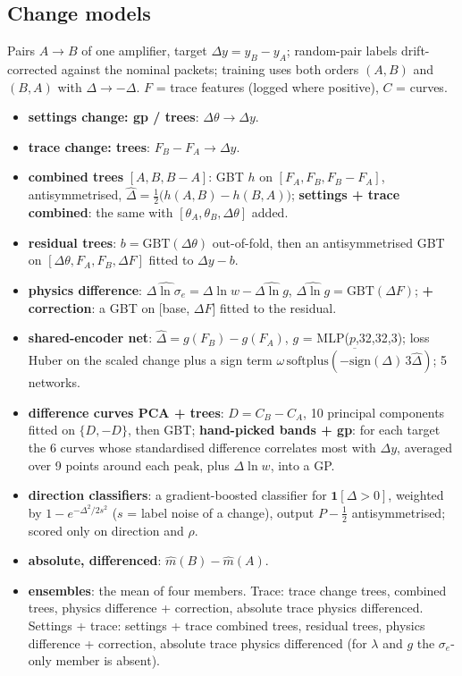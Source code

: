\documentclass[10pt,a4paper]{article}
\newcommand{\one}{\mathbf 1}
\begin{document}
\subsection{Change models}
Pairs $A\to B$ of one amplifier, target $\Delta y=y_B-y_A$; random-pair labels drift-corrected against the nominal packets;
training uses both orders $(A,B)$ and $(B,A)$ with $\Delta\to-\Delta$. $F$ = trace features (logged where positive), $C$ = curves.
\begin{itemize}
\item \textbf{settings change: gp / trees}: $\Delta\theta\to\Delta y$.
\item \textbf{trace change: trees}: $F_B-F_A\to\Delta y$.
\item \textbf{combined trees} $[A,B,B-A]$: GBT $h$ on $[F_A,F_B,F_B-F_A]$, antisymmetrised,
  $\widehat\Delta=\tfrac12\big(h(A,B)-h(B,A)\big)$; \textbf{settings + trace combined}: the same with $[\theta_A,\theta_B,\Delta\theta]$ added.
\item \textbf{residual trees}: $b=\text{GBT}(\Delta\theta)$ out-of-fold, then an antisymmetrised GBT on $[\Delta\theta,F_A,F_B,\Delta F]$
  fitted to $\Delta y-b$.
\item \textbf{physics difference}: $\widehat{\Delta\ln\sigma_e}=\Delta\ln w-\widehat{\Delta\ln g}$, $\widehat{\Delta\ln g}=\text{GBT}(\Delta F)$;
  \textbf{+ correction}: a GBT on [base, $\Delta F$] fitted to the residual.
\item \textbf{shared-encoder net}: $\widehat\Delta=g(F_B)-g(F_A)$, $g$ = MLP($p$,32,32,3); loss Huber \cite{huber1964} on the
  scaled change plus a sign term $\overline{\omega\,\mathrm{softplus}(-\mathrm{sign}(\Delta)\,3\widehat\Delta)}$; 5 networks.
\item \textbf{difference curves PCA + trees}: $D=C_B-C_A$, 10 principal components \cite{pearson1901} fitted on $\{D,-D\}$, then GBT;
  \textbf{hand-picked bands + gp}: for each target the 6 curves whose standardised difference correlates most with $\Delta y$, averaged
  over 9 points around each peak, plus $\Delta\ln w$, into a GP.
\item \textbf{direction classifiers}: a gradient-boosted classifier for $\one[\Delta>0]$, weighted by $1-e^{-\Delta^2/2s^2}$
  ($s$ = label noise of a change), output $P-\frac12$ antisymmetrised; scored only on direction and $\rho$.
\item \textbf{absolute, differenced}: $\hat m(B)-\hat m(A)$.
\item \textbf{ensembles}: the mean of four members. Trace: trace change trees, combined trees, physics difference + correction,
  absolute trace physics differenced. Settings + trace: settings + trace combined trees, residual trees, physics difference +
  correction, absolute trace physics differenced (for $\lambda$ and $g$ the $\sigma_e$-only member is absent).
\end{itemize}
\end{document}
